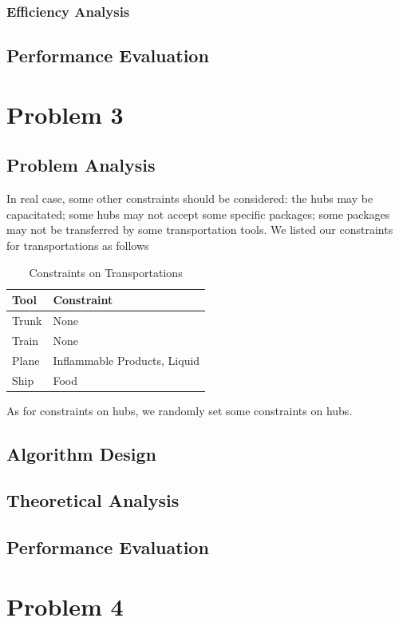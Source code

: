 \documentclass{llncs}
\begin{document}
\subsubsection{Efficiency Analysis}
\subsection{Performance Evaluation}

\section{Problem 3}
\subsection{Problem Analysis}
In real case, some other constraints should be considered: the hubs may be capacitated; some hubs may not accept some specific packages; some packages
may not be transferred by some transportation tools. We listed our constraints for transportations as follows
\begin{table}
  \caption{Constraints on Transportations}\label{cts1}
  \centering
  \begin{tabular}{|l|l|}
  \hline
  Tool &  Constraint \\
  \hline
  Trunk & None\\
  \hline
  Train & None\\
  \hline
  Plane & Inflammable Products, Liquid \\
  \hline
  Ship & Food \\
  \hline
  \end{tabular}
\end{table}
As for constraints on hubs, we randomly set some constraints on hubs.
\subsection{Algorithm Design}
\subsection{Theoretical Analysis}
\subsection{Performance Evaluation}

\section{Problem 4}
\end{document}
